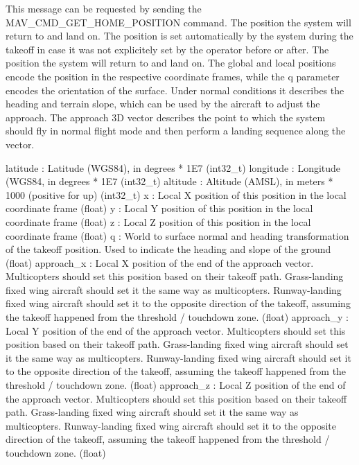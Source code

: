 \begin{DoxyVerb}
\begin{DoxyVerb}
\begin{DoxyVerb}
\begin{DoxyVerb}
\begin{DoxyVerb}This message can be requested by sending the MAV_CMD_GET_HOME_POSITION
command. The position the system will return to and
land on. The position is set automatically by the
system during the takeoff in case it was not
explicitely set by the operator before or after. The
position the system will return to and land on. The
global and local positions encode the position in the
respective coordinate frames, while the q parameter
encodes the orientation of the surface. Under normal
conditions it describes the heading and terrain slope,
which can be used by the aircraft to adjust the
approach. The approach 3D vector describes the point
to which the system should fly in normal flight mode
and then perform a landing sequence along the vector.

latitude                  : Latitude (WGS84), in degrees * 1E7 (int32_t)
longitude                 : Longitude (WGS84, in degrees * 1E7 (int32_t)
altitude                  : Altitude (AMSL), in meters * 1000 (positive for up) (int32_t)
x                         : Local X position of this position in the local coordinate frame (float)
y                         : Local Y position of this position in the local coordinate frame (float)
z                         : Local Z position of this position in the local coordinate frame (float)
q                         : World to surface normal and heading transformation of the takeoff position. Used to indicate the heading and slope of the ground (float)
approach_x                : Local X position of the end of the approach vector. Multicopters should set this position based on their takeoff path. Grass-landing fixed wing aircraft should set it the same way as multicopters. Runway-landing fixed wing aircraft should set it to the opposite direction of the takeoff, assuming the takeoff happened from the threshold / touchdown zone. (float)
approach_y                : Local Y position of the end of the approach vector. Multicopters should set this position based on their takeoff path. Grass-landing fixed wing aircraft should set it the same way as multicopters. Runway-landing fixed wing aircraft should set it to the opposite direction of the takeoff, assuming the takeoff happened from the threshold / touchdown zone. (float)
approach_z                : Local Z position of the end of the approach vector. Multicopters should set this position based on their takeoff path. Grass-landing fixed wing aircraft should set it the same way as multicopters. Runway-landing fixed wing aircraft should set it to the opposite direction of the takeoff, assuming the takeoff happened from the threshold / touchdown zone. (float)\end{DoxyVerb}

\end{DoxyVerb}
\end{DoxyVerb}
\end{DoxyVerb}
\end{DoxyVerb}

